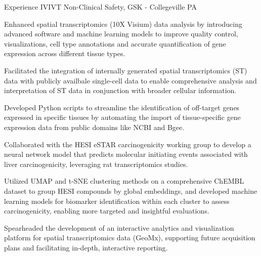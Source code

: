 \documentclass[]{resume-knyte}
\begin{document}
\begin{topic}{Experience}
    {IVIVT Non-Clinical Safety, GSK - Collegeville PA}
    {
    \item Enhanced spatial transcriptomics (10X Visium) data analysis by introducing advanced software and machine learning models to improve quality control, visualizations, cell type annotations and accurate quantification of gene expression across different tissue types.
    \vspace{-5pt}

    \item Facilitated the integration of internally generated spatial transcriptomics (ST) data with publicly availbale single-cell data to enable comprehensive analysis and interpretation of ST data in conjunction with broader cellular information.
    \vspace{-5pt}

    \item Developed Python scripts to streamline the identification of off-target genes expressed in specific tissues by automating the import of tissue-specific gene expression data from public domains like NCBI and Bgee.
    \vspace{-5pt}

    \item Collaborated with the HESI eSTAR carcinogenicity working group to develop a neural network model that predicts molecular initiating events associated with liver carcinogenicity, leveraging rat transcriptomics studies.
    \vspace{-5pt}

    \item Utilized UMAP and t-SNE clustering methods on a comprehensive ChEMBL dataset to group HESI compounds by global embeddings, and developed machine learning models for biomarker identification within each cluster to assess carcinogenicity, enabling more targeted and insightful evaluations.
    \vspace{-5pt}

    \item Spearheaded the development of an interactive analytics and visualization platform for spatial transcriptomics data (GeoMx), supporting future acquisition plans and facilitating in-depth, interactive reporting.
    \vspace{-5pt}

}
\end{topic}
\end{document}
